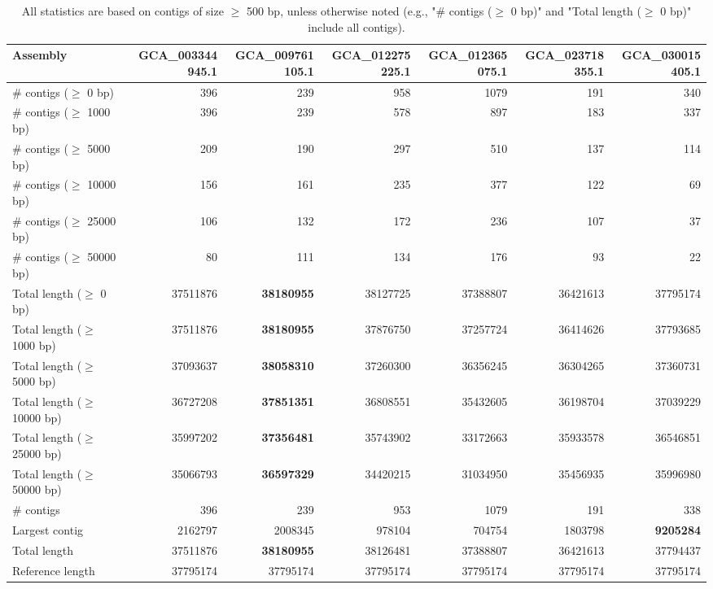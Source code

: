 \documentclass[12pt,a4paper]{article}
\begin{document}
\begin{table}[ht]
\begin{center}
\caption{All statistics are based on contigs of size $\geq$ 500 bp, unless otherwise noted (e.g., "\# contigs ($\geq$ 0 bp)" and "Total length ($\geq$ 0 bp)" include all contigs).}
\begin{tabular}{|l*{6}{|r}|}
\hline
Assembly & GCA\_003344945.1 & GCA\_009761105.1 & GCA\_012275225.1 & GCA\_012365075.1 & GCA\_023718355.1 & GCA\_030015405.1 \\ \hline
\# contigs ($\geq$ 0 bp) & 396 & 239 & 958 & 1079 & 191 & 340 \\ \hline
\# contigs ($\geq$ 1000 bp) & 396 & 239 & 578 & 897 & 183 & 337 \\ \hline
\# contigs ($\geq$ 5000 bp) & 209 & 190 & 297 & 510 & 137 & 114 \\ \hline
\# contigs ($\geq$ 10000 bp) & 156 & 161 & 235 & 377 & 122 & 69 \\ \hline
\# contigs ($\geq$ 25000 bp) & 106 & 132 & 172 & 236 & 107 & 37 \\ \hline
\# contigs ($\geq$ 50000 bp) & 80 & 111 & 134 & 176 & 93 & 22 \\ \hline
Total length ($\geq$ 0 bp) & 37511876 & {\bf 38180955} & 38127725 & 37388807 & 36421613 & 37795174 \\ \hline
Total length ($\geq$ 1000 bp) & 37511876 & {\bf 38180955} & 37876750 & 37257724 & 36414626 & 37793685 \\ \hline
Total length ($\geq$ 5000 bp) & 37093637 & {\bf 38058310} & 37260300 & 36356245 & 36304265 & 37360731 \\ \hline
Total length ($\geq$ 10000 bp) & 36727208 & {\bf 37851351} & 36808551 & 35432605 & 36198704 & 37039229 \\ \hline
Total length ($\geq$ 25000 bp) & 35997202 & {\bf 37356481} & 35743902 & 33172663 & 35933578 & 36546851 \\ \hline
Total length ($\geq$ 50000 bp) & 35066793 & {\bf 36597329} & 34420215 & 31034950 & 35456935 & 35996980 \\ \hline
\# contigs & 396 & 239 & 953 & 1079 & 191 & 338 \\ \hline
Largest contig & 2162797 & 2008345 & 978104 & 704754 & 1803798 & {\bf 9205284} \\ \hline
Total length & 37511876 & {\bf 38180955} & 38126481 & 37388807 & 36421613 & 37794437 \\ \hline
Reference length & 37795174 & 37795174 & 37795174 & 37795174 & 37795174 & 37795174 \\ \hline

\end{tabular}
\end{center}
\end{table}
\end{document}
